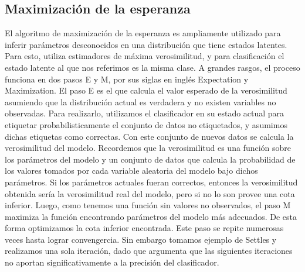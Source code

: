 \subsection{Maximización de la esperanza}
El algoritmo de maximización de la esperanza es ampliamente utilizado para inferir parámetros desconocidos en una distribución que tiene estados latentes. Para esto, utiliza estimadores de máxima verosimilitud, y para clasificación el estado latente al que nos referimos es la misma clase. A grandes rasgos, el proceso funciona en dos pasos E y M, por sus siglas en inglés Expectation y Maximization.
El paso E es el que calcula el valor esperado de la verosimilitud asumiendo que la distribución actual es verdadera y no existen variables no observadas. Para realizarlo, utilizamos el clasificador en su estado actual para etiquetar probabilisticamente el conjunto de datos no etiquetados, y asumimos dichas etiquetas como correctas. Con este conjunto de nuevos datos se calcula la verosimilitud del modelo.
Recordemos que la verosimilitud es una función sobre los parámetros del modelo y un conjunto de datos que calcula la probabilidad de los valores tomados por cada variable aleatoria del modelo bajo dichos parámetros.
Si los parámetros actuales fueran correctos, entonces la verosimilitud obtenida sería la verosimilitud real del modelo, pero si no lo son provee una cota inferior. Luego, como tenemos una función sin valores no observados, el paso M maximiza la función encontrando parámetros del modelo más adecuados. De esta forma optimizamos la cota inferior encontrada.
Este paso se repite numerosas veces hasta lograr convengercia. Sin embargo tomamos ejemplo de Settles y realizamos una sola iteración, dado que argumenta que las siguientes iteraciones no aportan significativamente a la precisión del clasificador.





